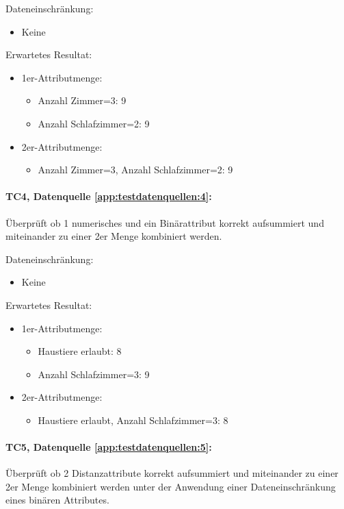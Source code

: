 Dateneinschränkung:
\begin{itemize}
	\item Keine
\end{itemize}

Erwartetes Resultat:
\begin{itemize}
	\item 1er-Attributmenge:
	\begin{itemize}
		\item Anzahl Zimmer=3: 9
		\item Anzahl Schlafzimmer=2: 9
	\end{itemize}
	\item 2er-Attributmenge:
	\begin{itemize}
		\item Anzahl Zimmer=3, Anzahl Schlafzimmer=2: 9
	\end{itemize}
\end{itemize}

\paragraph{TC4, Datenquelle \cref{app:testdatenquellen:4}:} Überprüft ob 1 numerisches und ein Binärattribut korrekt aufsummiert und miteinander zu einer 2er Menge kombiniert werden.

Dateneinschränkung:
\begin{itemize}
	\item Keine
\end{itemize}

Erwartetes Resultat:
\begin{itemize}
	\item 1er-Attributmenge:
	\begin{itemize}
		\item Haustiere erlaubt: 8
		\item Anzahl Schlafzimmer=3: 9
	\end{itemize}
	\item 2er-Attributmenge:
	\begin{itemize}
		\item Haustiere erlaubt, Anzahl Schlafzimmer=3: 8
	\end{itemize}
\end{itemize}

\paragraph{TC5, Datenquelle \cref{app:testdatenquellen:5}:} Überprüft ob 2 Distanzattribute korrekt aufsummiert und miteinander zu einer 2er Menge kombiniert werden unter der Anwendung einer Dateneinschränkung eines binären Attributes. 

